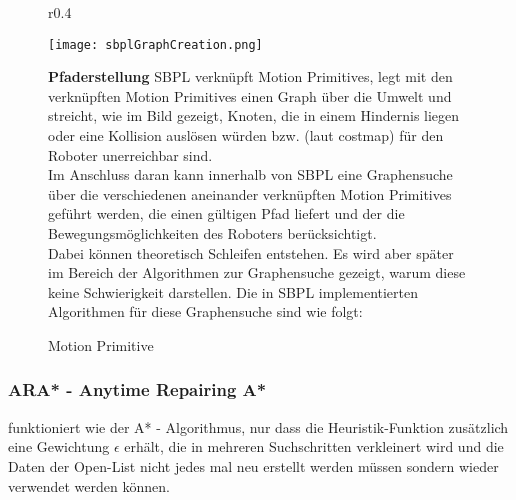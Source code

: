 \documentclass[oribibl]{llncs}
\begin{document}
\begin{figure}
\begin{wrapfigure}[20]{r}{0.4\textwidth}
  \begin{center}
  \vspace{-20pt}
    \texttt{[image: sbplGraphCreation.png]}
    \caption{Motion Primitive}
	\cite{SBPLRosSchool}
  \end{center}
\end{wrapfigure}
\textbf{Pfaderstellung} SBPL verknüpft Motion Primitives, legt mit den verknüpften Motion Primitives einen Graph über die Umwelt und streicht, wie im Bild gezeigt, Knoten, die in einem Hindernis liegen oder eine Kollision auslösen würden bzw. (laut costmap) für den Roboter unerreichbar sind.\\
Im Anschluss daran kann innerhalb von SBPL eine Graphensuche über die verschiedenen aneinander verknüpften Motion Primitives geführt werden, die einen gültigen Pfad liefert und der die Bewegungsmöglichkeiten des Roboters berücksichtigt.\\
Dabei können theoretisch Schleifen entstehen. Es wird aber später im Bereich der Algorithmen zur Graphensuche gezeigt, warum diese keine Schwierigkeit darstellen.
Die in SBPL implementierten Algorithmen für diese Graphensuche sind wie folgt:\\
\end{figure}
\newpage
\subsubsection{ARA* - Anytime Repairing A*} funktioniert wie der A* - Algorithmus, nur dass die Heuristik-Funktion zusätzlich eine Gewichtung $\epsilon$ erhält, die in mehreren Suchschritten verkleinert wird und die Daten der Open-List nicht jedes mal neu erstellt werden müssen sondern wieder verwendet werden können.\\
\end{document}
